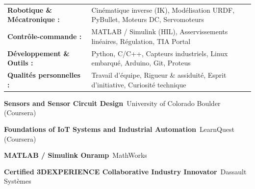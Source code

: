 \documentclass[10pt,a4paper]{../altacv}
\begin{document}
{\small
\begin{tabular}{@{}ll@{}}
\textbf{Robotique \& Mécatronique :} & Cinématique inverse (IK), Modélisation URDF, PyBullet, Moteurs DC, Servomoteurs \\[1.5pt]
\textbf{Contrôle-commande :} & MATLAB / Simulink (HIL), Asservissements linéaires, Régulation, TIA Portal \\[1.5pt]
\textbf{Développement \& Outils :} & Python, C/C++, Capteurs industriels, Linux embarqué, Arduino, Git, Proteus \\[1.5pt]
\textbf{Qualités personnelles :} & Travail d’équipe, Rigueur \& assiduité, Esprit d’initiative, Curiosité technique
\end{tabular}
}

\begin{cvitems}
  \item \textbf{Sensors and Sensor Circuit Design}~\hfill {\color{emphasis}University of Colorado Boulder (Coursera)}
  \item \textbf{Foundations of IoT Systems and Industrial Automation}~\hfill {\color{emphasis}LearnQuest (Coursera)}
  \item \textbf{MATLAB / Simulink Onramp}~\hfill {\color{emphasis}MathWorks}
  \item \textbf{Certified 3DEXPERIENCE Collaborative Industry Innovator}~\hfill {\color{emphasis}Dassault Systèmes}
\end{cvitems}

\cvactivites
\cvlangues
\end{document}
